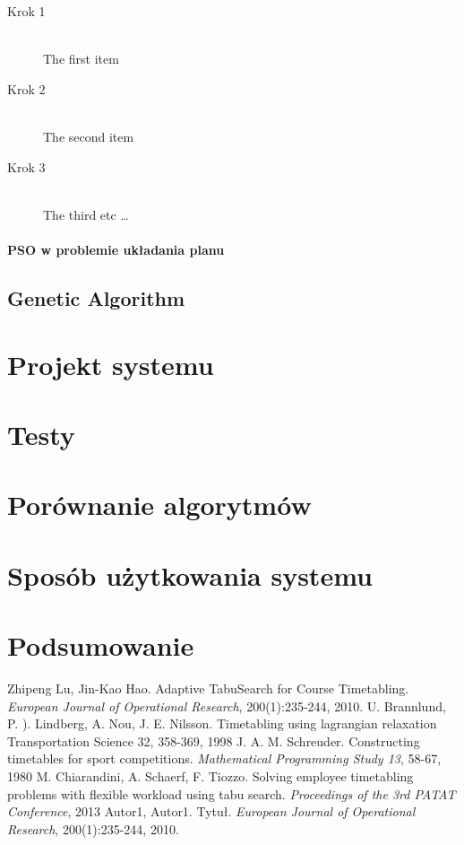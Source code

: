 \documentclass[11pt]{report}
\begin{document}
\begin{description}
  \item[Krok 1] \hfill \\
  The first item
  \item[Krok 2] \hfill \\
  The second item
  \item[Krok 3] \hfill \\
  The third etc \ldots
\end{description}

\subsubsection{PSO w problemie układania planu}
\section{Genetic Algorithm}
\chapter{Projekt systemu}
\chapter{Testy}
\chapter{Porównanie algorytmów}
\chapter{Sposób użytkowania systemu}
\chapter{Podsumowanie}

\begin{thebibliography}{2}
 Zhipeng Lu, Jin-Kao Hao. Adaptive TabuSearch for Course Timetabling.  \emph{European Journal of Operational Research}, 200(1):235-244, 2010.
 U. Brannlund, P. ). Lindberg, A. Nou, J. E. Nilsson. Timetabling using lagrangian relaxation Transportation Science 32, 358-369, 1998
 J. A. M. Schreuder. Constructing timetables for sport competitions. \emph{Mathematical Programming Study 13}, 58-67, 1980
 M. Chiarandini, A. Schaerf, F. Tiozzo. Solving employee timetabling problems with flexible workload using tabu search. \emph{Proceedings of the 3rd PATAT Conference}, 2013
 Autor1, Autor1. Tytuł.  \emph{European Journal of Operational Research}, 200(1):235-244, 2010.
\end{thebibliography}
\end{document}
